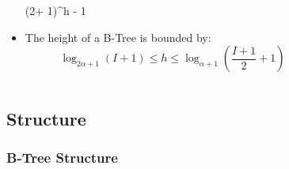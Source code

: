 \documentclass{beamer}
\begin{document}
\begin{frame}
\begin{columns}
\begin{column}{\textlecolumn}
\begin{block}{}
\begin{itemize}
                            \left(2\alpha + 1\right)^h - 1
                        \)
                    \item The height of a B-Tree is bounded by:
                        \[
                            \log_{2\alpha + 1}\left(I + 1\right)
                            \leq
                            h
                            \leq
                            \log_{\alpha + 1}\left(\frac{I + 1}{2} + 1\right)
                        \]
                \end{itemize}
            \end{block}
        \end{column}
        \begin{column}{\textricolumn}
        \end{column}
    \end{columns}
\end{frame}
\begin{frame}
    \subsection{Structure}
    \frametitle{B-Tree Structure}
    \begin{columns}
        \begin{column}{\textricolumn}
        \end{column}
    \end{columns}
\end{frame}
\end{document}
